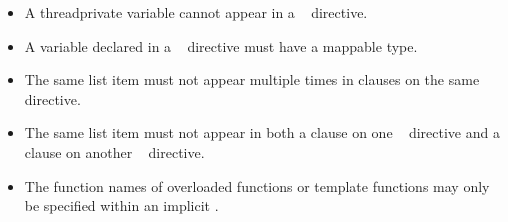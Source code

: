 \restrictions
\begin{itemize}
\item A threadprivate variable cannot appear in a 
      ~ directive.

\item A variable declared in a ~ directive 
      must have a mappable type.

\item The same list item must not appear multiple times in clauses on the same directive.

\item The same list item must not appear in both a  clause on one
~ directive and a  clause on
another ~ directive.

\end{itemize}

\begin{cppspecific}
\begin{itemize}
\item The function names of overloaded functions or template functions
may only be specified within an implicit .
\end{itemize}
\end{cppspecific}

